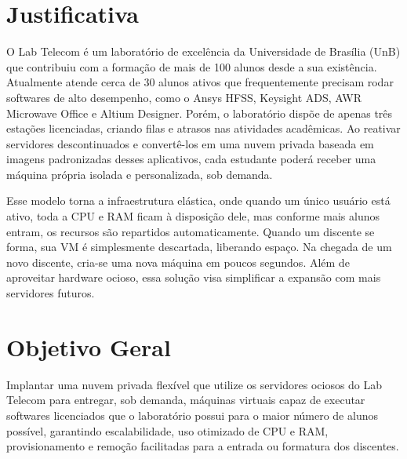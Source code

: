 \section{Justificativa}
O Lab Telecom é um laboratório de excelência da Universidade de Brasília (UnB) que contribuiu com a formação de mais de 100 alunos desde a sua existência. Atualmente atende cerca de 30 alunos ativos que frequentemente precisam rodar softwares de alto desempenho, como o Ansys HFSS, Keysight ADS, AWR Microwave Office e Altium Designer. Porém, o laboratório dispõe de apenas três estações licenciadas, criando filas e atrasos nas atividades acadêmicas. Ao reativar servidores descontinuados e convertê-los em uma nuvem privada baseada em imagens padronizadas desses aplicativos, cada estudante poderá receber uma máquina própria isolada e personalizada, sob demanda.

Esse modelo torna a infraestrutura elástica, onde quando um único usuário está ativo, toda a CPU e RAM ficam à disposição dele, mas conforme mais alunos entram, os recursos são repartidos automaticamente. Quando um discente se forma, sua VM é simplesmente descartada, liberando espaço. Na chegada de um novo discente, cria-se uma nova máquina em poucos segundos. Além de aproveitar hardware ocioso, essa solução visa simplificar a expansão com mais servidores futuros.

\section{Objetivo Geral}
Implantar uma nuvem privada flexível que utilize os servidores ociosos do Lab Telecom para entregar, sob demanda, máquinas virtuais capaz de executar softwares licenciados que o laboratório possui para o maior número de alunos possível, garantindo escalabilidade, uso otimizado de CPU e RAM, provisionamento e remoção facilitadas para a entrada ou formatura dos discentes.

